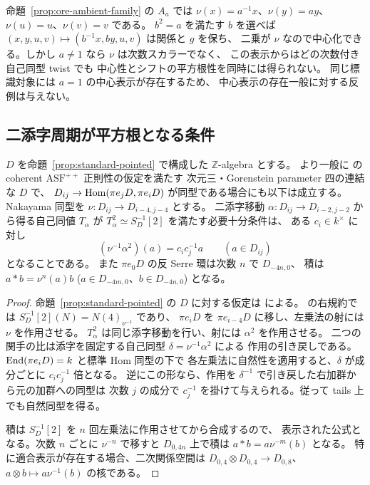 \begin{example}
\label{ex:ore-central-twist}
命題~\ref{prop:ore-ambient-family} の $A_a$ では
$\nu(x)=a^{-1}x$、$\nu(y)=ay$、$\nu(u)=u$、$\nu(v)=v$ である。
$b^2=a$ を満たす $b$ を選べば
$(x,y,u,v)\mapsto (b^{-1}x,by,u,v)$ は関係と $g$ を保ち、
二乗が $\nu$ なので中心化できる。しかし $a\ne1$ なら $\nu$ は次数スカラーでなく、
この表示からはどの次数付き自己同型 twist でも
中心性とシフトの平方根性を同時には得られない。
同じ標識対象には $a=1$ の中心表示が存在するため、
中心表示の存在一般に対する反例は与えない。
\end{example}

\subsection{二添字周期が平方根となる条件}

\begin{proposition}
\label{prop:periodicity-gauge}
$D$ を命題~\ref{prop:standard-pointed} で構成した $\mathbb Z$-algebra とする。
より一般に \cite[Theorem 6.8]{MN2025} の coherent $\mathrm{ASF}^{++}$ 正則性の仮定を満たす
次元三・Gorenstein parameter 四の連結な $D$ で、
$D_{ij}\to\operatorname{Hom}(\pi e_jD,\pi e_iD)$ が同型である場合にも以下は成立する。
Nakayama 同型を $\nu:D_{ij}\to D_{i-4,j-4}$ とする。
二添字移動 $\alpha:D_{ij}\to D_{i-2,j-2}$ から得る自己同値 $T_\alpha$ が
$T_\alpha^2\simeq S_D^{-1}[2]$ を満たす必要十分条件は、
ある $c_i\in k^\times$ に対し
\[
 (\nu^{-1}\alpha^2)(a)=c_i c_j^{-1}a\qquad (a\in D_{ij})
\]
となることである。
また $\pi e_0D$ の反 Serre 環は次数 $n$ で $D_{-4n,0}$、
積は $a*b=\nu^n(a)b$ ($a\in D_{-4m,0}$、$b\in D_{-4n,0}$) となる。
\end{proposition}
\begin{proof}
命題~\ref{prop:standard-pointed} の $D$ に対する仮定は
\cite[Theorems 6.4, 6.13 and Proposition 4.11]{MN2025} による。
\cite[Theorem 6.8]{MN2025} の右規約では
$S_D^{-1}[2](N)=N(4)_{\nu^{-1}}$ であり、
$\pi e_iD$ を $\pi e_{i-4}D$ に移し、左乗法の射には $\nu$ を作用させる。
$T_\alpha^2$ は同じ添字移動を行い、射には $\alpha^2$ を作用させる。
二つの関手の比は添字を固定する自己同型 $\delta=\nu^{-1}\alpha^2$ による
作用の引き戻しである。
$\operatorname{End}(\pi e_iD)=k$ と標準 Hom 同型の下で
各左乗法に自然性を適用すると、$\delta$ が成分ごとに $c_i c_j^{-1}$ 倍となる。
逆にこの形なら、作用を $\delta^{-1}$ で引き戻した右加群から元の加群への同型は
次数 $j$ の成分で $c_j^{-1}$ を掛けて与えられる。従って tails 上でも自然同型を得る。

積は $S_D^{-1}[2]$ を $n$ 回左乗法に作用させてから合成するので、
表示された公式となる。次数 $n$ ごとに $\nu^{-n}$ で移すと
$D_{0,4n}$ 上で積は $a*b=a\nu^{-m}(b)$ となる。
特に適合表示が存在する場合、二次関係空間は
$D_{0,4}\otimes D_{0,4}\to D_{0,8}$、$a\otimes b\mapsto a\nu^{-1}(b)$
の核である。
\end{proof}

